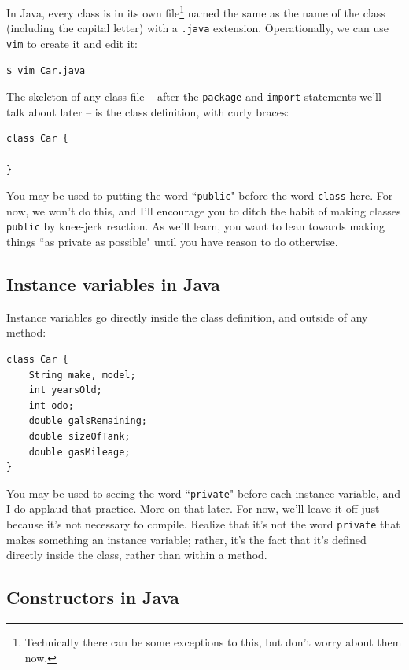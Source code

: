 In Java, every class is in its own file\footnote{Technically there can be
some exceptions to this, but don't worry about them now.} named the same as
the name of the class (including the capital letter) with a \texttt{.java}
extension. Operationally, we can use \texttt{vim} to create it and edit it:

\begin{verbatim}
$ vim Car.java
\end{verbatim}

The skeleton of any class file -- after the \texttt{package} and
\texttt{import} statements we'll talk about later -- is the class definition,
with curly braces:

\begin{Verbatim}[samepage=true,fontsize=\footnotesize,frame=single]
class Car {
    
}
\end{Verbatim}

You may be used to putting the word ``\texttt{public}" before the word
\texttt{class} here. For now, we won't do this, and I'll encourage you to
ditch the habit of making classes \texttt{public} by knee-jerk reaction. As
we'll learn, you want to lean towards making things ``as private as possible"
until you have reason to do otherwise.

\subsection{Instance variables in Java}

Instance variables go directly inside the class definition, and outside of any
method:

\begin{Verbatim}[samepage=true,fontsize=\footnotesize,frame=single]
class Car {
    String make, model;
    int yearsOld;
    int odo;
    double galsRemaining;
    double sizeOfTank;
    double gasMileage;    
}
\end{Verbatim}

You may be used to seeing the word ``\texttt{private}" before each instance
variable, and I do applaud that practice. More on that later. For now, we'll
leave it off just because it's not necessary to compile. Realize that it's not
the word \texttt{private} that makes something an instance variable; rather,
it's the fact that it's defined directly inside the class, rather than within
a method.

\subsection{Constructors in Java}

